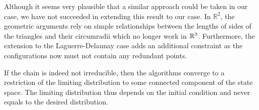 Although it seems very plausible that a similar approach could be taken in our case, we have not succeeded in extending this result to our case. In $\mathbb R^2$, the geometric arguments rely on simple relationships between the lengths of sides of the triangles and their circumradii which no longer work in ${\mathbb R^3}$. Furthermore, the extension to the Laguerre-Delaunay case adds an additional constraint as the configurations now must not contain any redundant points.

If the chain is indeed not irreducible, then the algorithms converge to a restriction of the limiting distribution to some connected component of the state space. The limiting distribution thus depends on the initial condition and never equals to the desired distribution.
